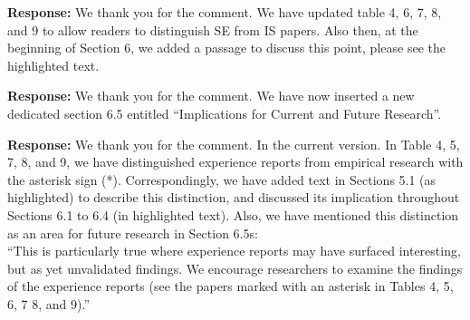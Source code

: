 \documentclass[a4paper,twoside,11pt]{reviewresponse}
\begin{document}
\textbf{Response:}
We thank you for the comment. We have updated table 4, 6, 7, 8, and 9 to allow readers to distinguish SE from IS papers. Also then, at the beginning of Section 6, we added a passage to discuss this point, please see the highlighted text.

\textbf{Response:}
We thank you for the comment. We have now inserted a new dedicated section 6.5 entitled ``Implications for Current and Future Research''. 

\textbf{Response:}
We thank you for the comment. In the current version. In Table 4, 5, 7, 8, and 9, we have distinguished experience reports from empirical research with the asterisk sign (*). Correspondingly, we have added text in Sections 5.1 (as highlighted) to describe this distinction, and discussed its implication throughout Sections 6.1 to 6.4 (in highlighted text). Also, we have mentioned this distinction as an area for future research in Section 6.5s:\\
``This is particularly true where experience reports may have surfaced interesting, but as yet unvalidated findings. We encourage researchers to examine the findings of the experience reports (see the papers marked with an asterisk in Tables 4, 5, 6, 7 8, and 9).''
\end{document}
